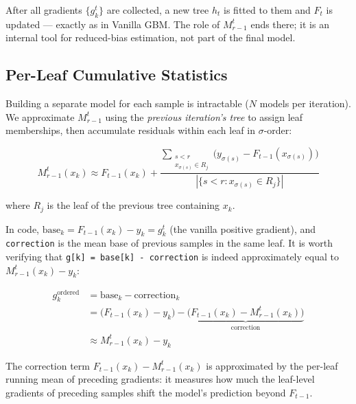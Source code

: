 \documentclass[11pt, a4paper]{article}
\begin{document}
After all gradients $\{g_k^t\}$ are collected, a new tree $h_t$ is fitted
to them and $F_t$ is updated --- exactly as in Vanilla GBM.
The role of $M_{r-1}^t$ ends there; it is an internal tool for
reduced-bias estimation, not part of the final model.

\subsection{Per-Leaf Cumulative Statistics}

Building a separate model for each sample is intractable ($N$ models
per iteration). We approximate $M_{r-1}^t$ using the \emph{previous
iteration's tree} to assign leaf memberships, then accumulate
residuals within each leaf in $\sigma$-order:

\[
M_{r-1}^t(x_k) \approx F_{t-1}(x_k) +
\frac{\displaystyle\sum_{\substack{s<r \\ x_{\sigma(s)}\in R_j}}
      \bigl(y_{\sigma(s)} - F_{t-1}(x_{\sigma(s)})\bigr)}
     {\displaystyle\left|\{s<r : x_{\sigma(s)}\in R_j\}\right|}
\]

where $R_j$ is the leaf of the previous tree containing $x_k$.

In code, $\mathrm{base}_k = F_{t-1}(x_k) - y_k = g_k^t$ (the vanilla positive gradient),
and \texttt{correction} is the mean base of previous samples in the same leaf.
It is worth verifying that \texttt{g[k] = base[k] - correction} is indeed
approximately equal to $M_{r-1}^t(x_k) - y_k$:

\begin{align*}
g_k^{\text{ordered}} &= \mathrm{base}_k - \mathrm{correction}_k \\
    &= \bigl(F_{t-1}(x_k) - y_k\bigr)
       - \underbrace{\bigl(F_{t-1}(x_k) - M_{r-1}^t(x_k)\bigr)}_{\text{correction}} \\
    &\approx M_{r-1}^t(x_k) - y_k
\end{align*}

The correction term $F_{t-1}(x_k) - M_{r-1}^t(x_k)$ is approximated by the
per-leaf running mean of preceding gradients: it measures how much the leaf-level
gradients of preceding samples shift the model's prediction beyond $F_{t-1}$.
\end{document}
